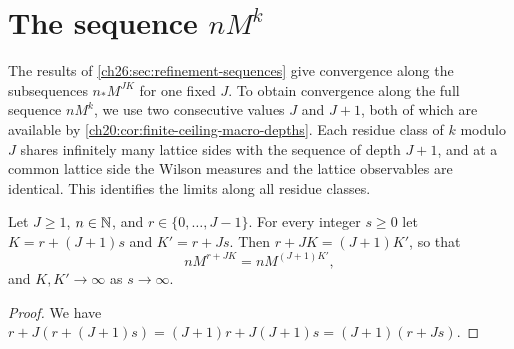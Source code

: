 \section{The sequence \texorpdfstring{$nM^k$}{nM\^{}k}}\label{ch26:sec:full-sequence}

The results of \cref{ch26:sec:refinement-sequences} give convergence along the subsequences $n_*M^{JK}$ for one fixed $J$. To obtain convergence along the full sequence $nM^k$, we use two consecutive values $J$ and $J+1$, both of which are available by \cref{ch20:cor:finite-ceiling-macro-depths}. Each residue class of $k$ modulo $J$ shares infinitely many lattice sides with the sequence of depth $J+1$, and at a common lattice side the Wilson measures and the lattice observables are identical. This identifies the limits along all residue classes. 

\begin{lemma}\label{ch26:lem:consecutive-depth-intersection}
Let $J\ge1$, $n\in\mathbb N$, and $r\in\{0,\dots,J-1\}$. For every integer $s\ge0$ let $K=r+(J+1)s$ and $K'=r+Js$. Then $r+JK=(J+1)K'$, so that
\begin{equation}\label{ch26:eq:common-original-cutoffs}
 nM^{r+JK}=nM^{(J+1)K'} ,
\end{equation}
and $K,K'\to\infty$ as $s\to\infty$.
\end{lemma}

\begin{proof}
We have $r+J(r+(J+1)s)=(J+1)r+J(J+1)s=(J+1)(r+Js)$.
\end{proof}


